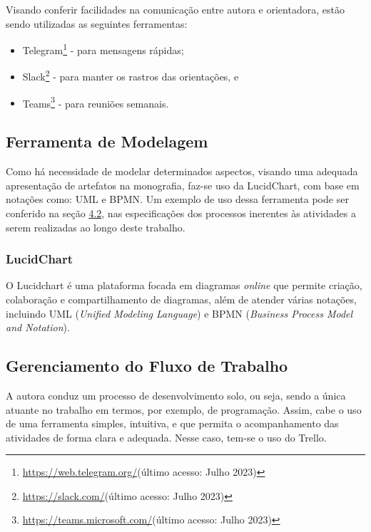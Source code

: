\begin{description}
    \item Visando conferir facilidades na comunicação entre autora e orientadora, estão sendo utilizadas as seguintes ferramentas:
          \begin{itemize}
              \item Telegram\footnote{\url{https://web.telegram.org/}(último acesso: Julho 2023)} - para mensagens rápidas;

              \item Slack\footnote{\url{https://slack.com/}(último acesso: Julho 2023)} - para manter os rastros das orientações, e

              \item Teams\footnote{\url{https://teams.microsoft.com/}(último acesso: Julho 2023)} - para reuniões semanais.
          \end{itemize}
\end{description}

\subsection{Ferramenta de Modelagem}
\label{sec:Ferramenta de Modelagem}
Como há necessidade de modelar determinados aspectos, visando uma adequada apresentação de artefatos na monografia, faz-se uso da LucidChart, com base em notações como: UML e BPMN. Um exemplo de 
uso dessa ferramenta pode ser conferido na seção \hyperref[sec:Fluxo de Atividades]{4.2}, nas especificações dos processos inerentes às atividades a serem realizadas ao longo deste trabalho.

\subsubsection{LucidChart}
\label{sec:LucidChart}
O Lucidchart \cite{lucidchart} é uma plataforma focada em diagramas \textit{online} que permite criação, colaboração e compartilhamento de diagramas, além de atender várias notações, incluindo UML (\textit{Unified Modeling Language}) 
e BPMN (\textit{Business Process Model and Notation}).

\subsection{Gerenciamento do Fluxo de Trabalho}
\label{sec:Gerenciamento do Fluxo de Trabalho}
A autora conduz um processo de desenvolvimento solo, ou seja, sendo a única atuante no trabalho em termos, por exemplo, de programação. Assim, cabe o uso de uma ferramenta simples, intuitiva, e que 
permita o acompanhamento das atividades de forma clara e adequada. Nesse caso, tem-se o uso do Trello.

